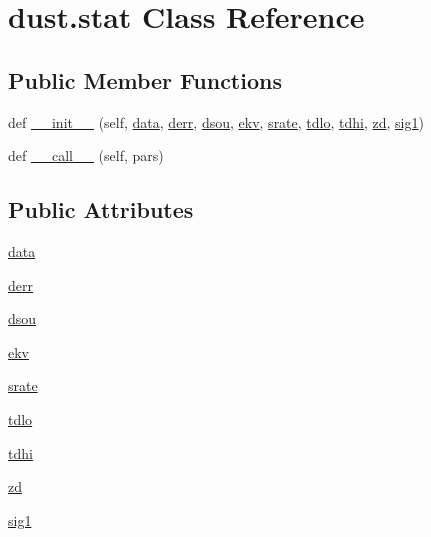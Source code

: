 \hypertarget{classdust_1_1stat}{}\section{dust.\+stat Class Reference}
\label{classdust_1_1stat}
\subsection*{Public Member Functions}
\begin{DoxyCompactItemize}
\item 
def \hyperlink{classdust_1_1stat_a9cad42985fd8e12c8cc4d9b7c7a60db1}{\+\_\+\+\_\+init\+\_\+\+\_\+} (self, \hyperlink{classdust_1_1stat_a39e00913851169b98a5ce67cbfcefeb2}{data}, \hyperlink{classdust_1_1stat_ae58b932aa4c445bc303c29465e176c8c}{derr}, \hyperlink{classdust_1_1stat_afec794109828be328b94bcef2532685a}{dsou}, \hyperlink{classdust_1_1stat_a123cf4e4c19ea06ebb7450db9c96224d}{ekv}, \hyperlink{classdust_1_1stat_a91904450b11fd9aae2f39396d99ae2da}{srate}, \hyperlink{classdust_1_1stat_aa82e111958383f1fcbddbe2f8ef1119b}{tdlo}, \hyperlink{classdust_1_1stat_a5097f82fc83e0630b9a66dde2d2bd728}{tdhi}, \hyperlink{classdust_1_1stat_ab7c8723c67dfb782f711d4d3804bed0e}{zd}, \hyperlink{classdust_1_1stat_a246fbcbf59a3d685e0a8fc7c5e658d00}{sig1})
\item 
def \hyperlink{classdust_1_1stat_a418ad82302827896a76257e60d90bdc1}{\+\_\+\+\_\+call\+\_\+\+\_\+} (self, pars)
\end{DoxyCompactItemize}
\subsection*{Public Attributes}
\begin{DoxyCompactItemize}
\item 
\hyperlink{classdust_1_1stat_a39e00913851169b98a5ce67cbfcefeb2}{data}
\item 
\hyperlink{classdust_1_1stat_ae58b932aa4c445bc303c29465e176c8c}{derr}
\item 
\hyperlink{classdust_1_1stat_afec794109828be328b94bcef2532685a}{dsou}
\item 
\hyperlink{classdust_1_1stat_a123cf4e4c19ea06ebb7450db9c96224d}{ekv}
\item 
\hyperlink{classdust_1_1stat_a91904450b11fd9aae2f39396d99ae2da}{srate}
\item 
\hyperlink{classdust_1_1stat_aa82e111958383f1fcbddbe2f8ef1119b}{tdlo}
\item 
\hyperlink{classdust_1_1stat_a5097f82fc83e0630b9a66dde2d2bd728}{tdhi}
\item 
\hyperlink{classdust_1_1stat_ab7c8723c67dfb782f711d4d3804bed0e}{zd}
\item 
\hyperlink{classdust_1_1stat_a246fbcbf59a3d685e0a8fc7c5e658d00}{sig1}
\end{DoxyCompactItemize}


